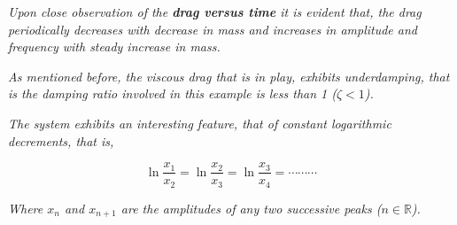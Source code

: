 \textit{Upon close observation of the \textbf{drag versus time} it is evident that, the drag periodically decreases with decrease in mass and increases in amplitude and frequency with steady increase in mass.}

\textit{As mentioned before, the viscous drag that is in play, exhibits underdamping, that is the damping ratio involved in this example is less than 1 ($\zeta < 1$).}

\textit{The system exhibits an interesting feature, that of constant logarithmic decrements, that is,}
        
    $$\ln{\frac{x_1}{x_2}} = \ln{\frac{x_2}{x_3}} = \ln{\frac{x_3}{x_4}} = \cdots\cdots\cdots$$
        
\textit{Where $x_n$ and $x_{n + 1}$ are the amplitudes of any two successive peaks ($n \in \mathbb{R}$).}
        


